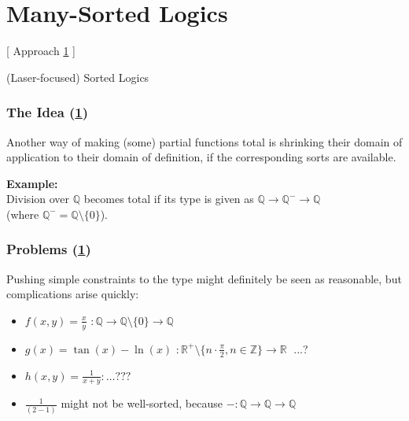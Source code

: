\documentclass[aspectratio=169, usenames, dvipsnames]{beamer}
\begin{document}
\section{Many-Sorted Logics} \label{manysorted}

\begin{frame}
\begin{center}
\Large [ Approach \ref{manysorted} ]\bigskip

(Laser-focused) Sorted Logics
\normalsize
\end{center}
\end{frame}


\begin{frame}
\frametitle{The Idea (\ref{manysorted})}
Another way of making (some) partial functions total is shrinking their domain of application to their domain of definition, if the corresponding sorts are available. 
\bigskip

\textbf{Example:}\\
Division over $\mathbb{Q}$ becomes total if its type is given as $\mathbb{Q} \to \mathbb{Q}^{-} \to \mathbb{Q} $\\ (where $\mathbb{Q}^{-} = \mathbb{Q} \setminus \{0\}$).
\end{frame}

\begin{frame}
\frametitle{Problems (\ref{manysorted})}

Pushing simple constraints to the type might definitely be seen as reasonable, but complications arise quickly:
\bigskip

\begin{itemize}
\item $f(x,y) = \frac{x}{y}$ \pause $: \mathbb{Q} \rightarrow \mathbb{Q}\setminus\{0\} \rightarrow \mathbb{Q}$\medskip

\pause\item $g(x) = \tan(x) - \ln(x)$ \pause $:  \mathbb{R}^{+}\setminus\{n \cdot \frac{\pi}{2}, n \in \mathbb{Z}\} \rightarrow \mathbb{R}\;$ ...?\medskip

\pause\item $h(x,y) = \frac{1}{x+y} : \dots???$

\pause\item $\frac{1}{(2-1)}$ might not be well-sorted, because $- : \mathbb{Q} \to \mathbb{Q} \to \mathbb{Q}$
\end{itemize}

\end{frame}

\end{document}
